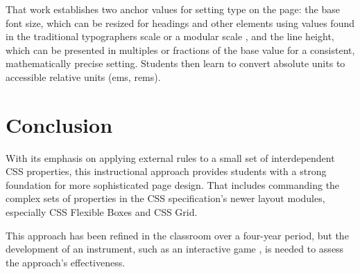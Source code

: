 \documentclass[sigconf]{acmart}
\begin{document}
That work establishes two anchor values for setting type on the page: the base font size, which can be resized for headings and other elements using values found in the traditional typographers scale or a modular scale \cite{brown:modular}, and the line height, which can be presented in multiples or fractions of the base value for a consistent, mathematically precise setting. Students then learn to convert absolute units to accessible relative units (ems, rems).

\section{Conclusion}
With its emphasis on applying external rules to a small set of interdependent CSS properties, this instructional approach provides students with a strong foundation for more sophisticated page design. That includes commanding the complex sets of properties in the CSS specification's newer layout modules, especially CSS Flexible Boxes and CSS Grid.

This approach has been refined in the classroom over a four-year period, but the development of an instrument, such as an interactive game \cite{kim:understanding}, is needed to assess the approach's effectiveness.



\end{document}
